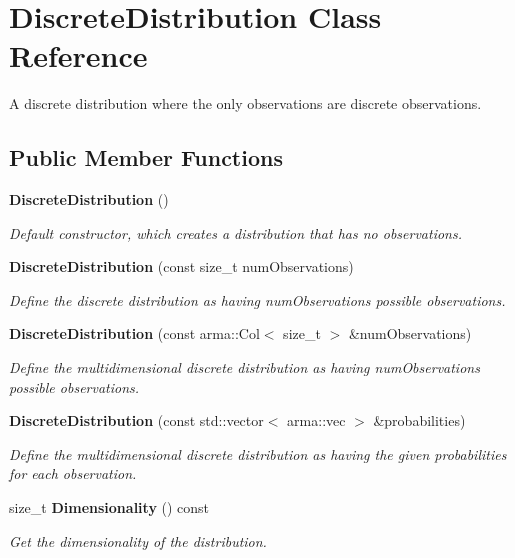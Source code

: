 \section{Discrete\+Distribution Class Reference}
\label{classmlpack_1_1distribution_1_1DiscreteDistribution}


A discrete distribution where the only observations are discrete observations.  


\subsection*{Public Member Functions}
\begin{DoxyCompactItemize}
\item 
\textbf{ Discrete\+Distribution} ()
\begin{DoxyCompactList}\small\item\em Default constructor, which creates a distribution that has no observations. \end{DoxyCompactList}\item 
\textbf{ Discrete\+Distribution} (const size\+\_\+t num\+Observations)
\begin{DoxyCompactList}\small\item\em Define the discrete distribution as having num\+Observations possible observations. \end{DoxyCompactList}\item 
\textbf{ Discrete\+Distribution} (const arma\+::\+Col$<$ size\+\_\+t $>$ \&num\+Observations)
\begin{DoxyCompactList}\small\item\em Define the multidimensional discrete distribution as having num\+Observations possible observations. \end{DoxyCompactList}\item 
\textbf{ Discrete\+Distribution} (const std\+::vector$<$ arma\+::vec $>$ \&probabilities)
\begin{DoxyCompactList}\small\item\em Define the multidimensional discrete distribution as having the given probabilities for each observation. \end{DoxyCompactList}\item 
size\+\_\+t \textbf{ Dimensionality} () const
\begin{DoxyCompactList}\small\item\em Get the dimensionality of the distribution. \end{DoxyCompactList}\item 

\end{DoxyCompactItemize}
